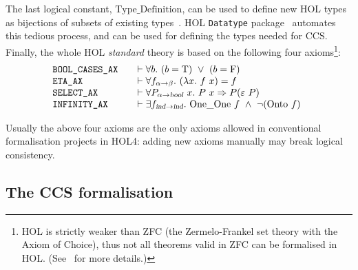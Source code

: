 \documentclass[GCNS]{yincog}
\theoremstyle{remark}
\theoremstyle{theorem}
\theoremstyle{remark}
\newcommand{\Tvtex}{\mathcal{T}}
\newcommand\fun{{\to}}
\newcommand{\tyvtex}[1]{\textsl{#1}}
\newcommand\conj{\ \wedge\ }
\newcommand\imp{ \Rightarrow }
\newcommand\hilbert{\varepsilon}
\newcommand{\uquant}[1]{\forall #1.\ }
\newcommand{\equant}[1]{\exists #1.\ }
\newcommand{\lquant}[1]{\lambda #1.\ }
\newcommand{\con}[1]{\mathrm{#1}}
\newcommand\ind{\tyvtex{ind}}
\renewcommand{\Tvtex}{\con{T}}
\newcommand\Fvtex{\con{F}}
\newcommand\OneOne{\con{One\_One}}
\newcommand\Onto{\con{Onto}}
\newcommand\TyDef{\con{Type\_Definition}}
\begin{document}
%
The last logical constant, $\TyDef $, can be used to define new HOL types
as bijections of subsets of existing types~\cite{Melham:1989dk}. HOL
\texttt{Datatype} package~\cite{Melham:1991,holdesc} automates this tedious
process, and can be used for defining the types needed for CCS. Finally,
the whole HOL \emph{standard} theory is based on the following four axioms\footnote{HOL
is strictly weaker than ZFC (the Zermelo-Frankel set theory with the Axiom
of Choice), thus not all theorems valid in ZFC can be formalised in HOL.
(See~\cite{hollogic} for more details.)}:
%
\begin{equation*}
%
\begin{array}{@{}l@{\qquad}l}
\mbox{\texttt{BOOL\_CASES\_AX}} &\vdash \uquant{b} (b = \Tvtex )\
\vee \ (b = \Fvtex )
\\
\mbox{\texttt{ETA\_AX}} & \vdash \uquant{f_{\alpha \fun \beta}}(
\lquant{x}f\ x) = f
\\
\mbox{\texttt{SELECT\_AX}} & \vdash
\uquant{P_{\alpha \fun \tyvtex{bool}}\ x} P\ x \imp P({\hilbert}\ P)
\\
\mbox{\texttt{INFINITY\_AX}}& \vdash \equant{f_{\ind \fun \ind}}
\OneOne \ f \conj \neg (\Onto \ f)
\\
\end{array}
%
\end{equation*}

Usually the above four axioms are the only axioms allowed in conventional
formalisation projects in HOL4: adding new axioms manually may break logical
consistency.

\subsection{The CCS formalisation}
 \label{ss:formalCCS}
\end{document}

